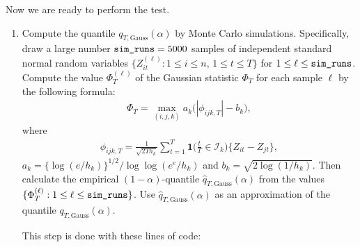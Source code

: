 \documentclass[a4paper]{scrartcl}
\begin{document}
Now we are ready to perform the test.
\begin{enumerate}[label=\textit{Step \arabic*.}, leftmargin=1.45cm]
  \item Compute the quantile $q_{T,\text{Gauss}}(\alpha)$ by Monte Carlo simulations. Specifically, draw a large number $\verb|sim_runs| = 5000$ samples of independent standard normal random variables $\{Z_{it}^{(\ell)} : 1 \le i \le n, \, 1 \le t \le T \}$ for $1 \le \ell \le \verb|sim_runs|$. Compute the value $\Phi_T^{(\ell)}$ of the Gaussian statistic $\Phi_T$ for each sample $\ell$ by the following formula:
\begin{align*}
\Phi_T = \max_{(i,j,k)} a_k \big( |\phi_{ijk,T}| - b_k \big),
\end{align*}
where
\begin{align*}
\phi_{ijk,T} = \frac{1}{\sqrt{2Th_k}} \sum\limits_{t=1}^T \mathbf{1}\Big(\frac{t}{T} \in \mathcal{I}_k\Big) \big\{ Z_{it} - Z_{jt} \big\},
\end{align*}
$a_k = \{\log(e/h_k)\}^{1/2} / \log \log(e^e / h_k)$ and $b_k = \sqrt{2 \log(1/h_k)}$. Then calculate the empirical $(1-\alpha)$-quantile $\hat{q}_{T,\text{Gauss}}(\alpha)$ from the values $\{ \Phi_T^{(\ell)}: 1 \le \ell \le \verb|sim_runs| \}$. Use $\hat{q}_{T,\text{Gauss}}(\alpha)$ as an approximation of the quantile $q_{T,\text{Gauss}}(\alpha)$.

This step is done with these lines of code:


\end{enumerate}
\end{document}
